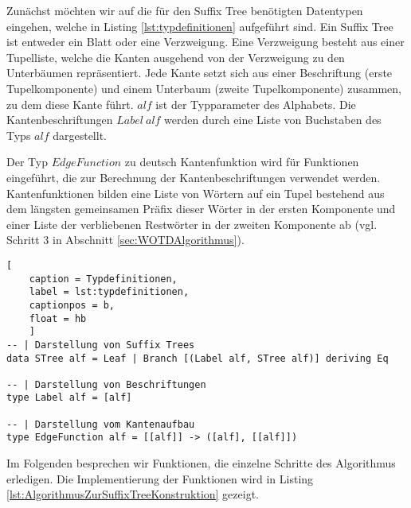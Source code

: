 \documentclass[12pt]{report}
\begin{document}
Zunächst möchten wir auf die für den Suffix Tree benötigten Datentypen eingehen, welche in Listing \ref{lst:typdefinitionen} aufgeführt sind. Ein Suffix Tree ist entweder ein Blatt oder eine Verzweigung. Eine Verzweigung besteht aus einer Tupelliste, welche die Kanten ausgehend von der Verzweigung zu den Unterbäumen repräsentiert. Jede Kante setzt sich aus einer Beschriftung (erste Tupelkomponente) und einem Unterbaum (zweite Tupelkomponente) zusammen, zu dem diese Kante führt. $alf$ ist der Typparameter des Alphabets. Die Kantenbeschriftungen $Label\:alf$ werden durch eine Liste von Buchstaben des Typs $alf$ dargestellt.

Der Typ $EdgeFunction$ zu deutsch Kantenfunktion wird für Funktionen eingeführt, die zur Berechnung der Kantenbeschriftungen verwendet werden. Kantenfunktionen bilden eine Liste von Wörtern auf ein Tupel bestehend aus dem längsten gemeinsamen Präfix dieser Wörter in der ersten Komponente und einer Liste der verbliebenen Restwörter in der zweiten Komponente ab (vgl. Schritt 3 in Abschnitt \ref{sec:WOTDAlgorithmus}).

\begin{lstlisting}[
    caption = Typdefinitionen,
    label = lst:typdefinitionen,
    captionpos = b,
    float = hb
    ]
-- | Darstellung von Suffix Trees
data STree alf = Leaf | Branch [(Label alf, STree alf)] deriving Eq

-- | Darstellung von Beschriftungen
type Label alf = [alf]

-- | Darstellung vom Kantenaufbau
type EdgeFunction alf = [[alf]] -> ([alf], [[alf]])
\end{lstlisting}

Im Folgenden besprechen wir Funktionen, die einzelne Schritte des Algorithmus erledigen. Die Implementierung der Funktionen wird in Listing \ref{lst:AlgorithmusZurSuffixTreeKonstruktion} gezeigt.
\end{document}

